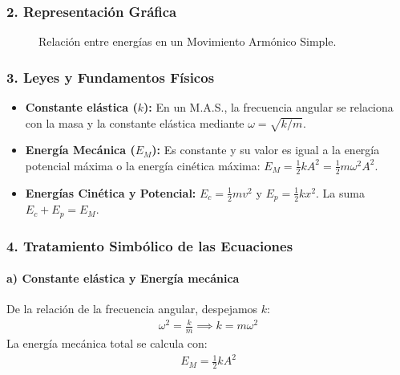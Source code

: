 \subsubsection*{2. Representación Gráfica}
\begin{figure}[H]
    \centering
    \caption{Relación entre energías en un Movimiento Armónico Simple.}
\end{figure}

\subsubsection*{3. Leyes y Fundamentos Físicos}
\begin{itemize}
    \item \textbf{Constante elástica ($k$):} En un M.A.S., la frecuencia angular se relaciona con la masa y la constante elástica mediante $\omega = \sqrt{k/m}$.
    \item \textbf{Energía Mecánica ($E_M$):} Es constante y su valor es igual a la energía potencial máxima o la energía cinética máxima: $E_M = \frac{1}{2}kA^2 = \frac{1}{2}m\omega^2A^2$.
    \item \textbf{Energías Cinética y Potencial:} $E_c = \frac{1}{2}mv^2$ y $E_p = \frac{1}{2}kx^2$. La suma $E_c+E_p=E_M$.
\end{itemize}

\subsubsection*{4. Tratamiento Simbólico de las Ecuaciones}
\paragraph{a) Constante elástica y Energía mecánica}
De la relación de la frecuencia angular, despejamos $k$:
\begin{gather}
    \omega^2 = \frac{k}{m} \implies k = m\omega^2
\end{gather}
La energía mecánica total se calcula con:
\begin{gather}
    E_M = \frac{1}{2}kA^2
\end{gather}
